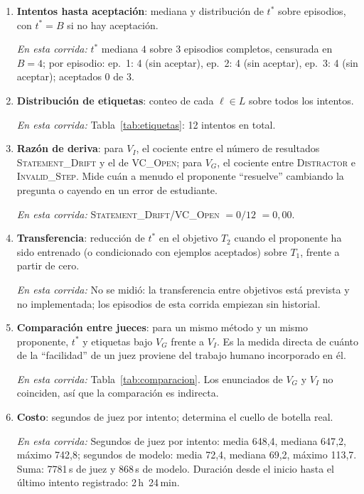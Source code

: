 \documentclass[11pt,a4paper]{article}
\begin{document}
\begin{enumerate}

  \item \textbf{Intentos hasta aceptación}: mediana y distribución de $t^*$ sobre episodios, con $t^* = B$ si no hay aceptación.

  \emph{En esta corrida:} $t^*$ mediana $4$ sobre 3 episodios completos, censurada en $B = 4$; por episodio: ep.~1: 4 (sin aceptar), ep.~2: 4 (sin aceptar), ep.~3: 4 (sin aceptar); aceptados 0 de 3.

  \item \textbf{Distribución de etiquetas}: conteo de cada $\ell \in L$ sobre todos los intentos.

  \emph{En esta corrida:} Tabla~\ref{tab:etiquetas}: 12 intentos en total.

  \item \textbf{Razón de deriva}: para $V_I$, el cociente entre el número de resultados \textsc{Statement\_Drift} y el de \textsc{VC\_Open}; para $V_G$, el cociente entre \textsc{Distractor} e \textsc{Invalid\_Step}. Mide cuán a menudo el proponente ``resuelve'' cambiando la pregunta o cayendo en un error de estudiante.

  \emph{En esta corrida:} \textsc{Statement\_Drift}/\textsc{VC\_Open} $= 0/12$ $= 0{,}00$.

  \item \textbf{Transferencia}: reducción de $t^*$ en el objetivo $T_2$ cuando el proponente ha sido entrenado (o condicionado con ejemplos aceptados) sobre $T_1$, frente a partir de cero.

  \emph{En esta corrida:} No se midió: la transferencia entre objetivos está prevista y no implementada; los episodios de esta corrida empiezan sin historial.

  \item \textbf{Comparación entre jueces}: para un mismo método y un mismo proponente, $t^*$ y etiquetas bajo $V_G$ frente a $V_I$. Es la medida directa de cuánto de la ``facilidad'' de un juez proviene del trabajo humano incorporado en él.

  \emph{En esta corrida:} Tabla~\ref{tab:comparacion}. Los enunciados de $V_G$ y $V_I$ no coinciden, así que la comparación es indirecta.

  \item \textbf{Costo}: segundos de juez por intento; determina el cuello de botella real.

  \emph{En esta corrida:} Segundos de juez por intento: media 648{,}4, mediana 647{,}2, máximo 742{,}8; segundos de modelo: media 72{,}4, mediana 69{,}2, máximo 113{,}7. Suma: 7781\,s de juez y 868\,s de modelo. Duración desde el inicio hasta el último intento registrado: 2\,h~24\,min.

\end{enumerate}
\end{document}
